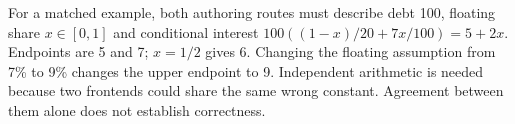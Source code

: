 For a matched example, both authoring routes must describe debt 100, floating
share $x\in[0,1]$ and conditional interest
$100((1-x)/20+7x/100)=5+2x$. Endpoints are 5 and 7; $x=1/2$ gives 6. Changing
the floating assumption from 7\% to 9\% changes the upper endpoint to 9.
Independent arithmetic is needed because two frontends could share the same
wrong constant. Agreement between them alone does not establish correctness.
